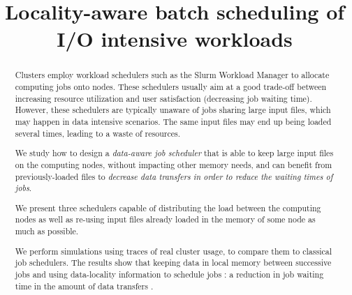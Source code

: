\documentclass[sigconf,review,anonymous]{acmart}
\newcommand{\rev}[1]{{\color{black}{#1}}}
\begin{document}
\title{Locality-aware batch scheduling of I/O intensive workloads}

\begin{abstract}
  Clusters employ workload schedulers such as
  the Slurm Workload Manager to allocate computing jobs onto
  nodes. These schedulers usually aim at a good trade-off between
  increasing resource utilization and user satisfaction (decreasing
  job waiting time). However, these schedulers are typically unaware
  of jobs sharing large input files, which may happen in data
  intensive scenarios. The same input files may end up being loaded several
  times, leading to a waste of resources.
   
  We study how to design a \textit{data-aware job scheduler} that is
  able to keep large input files on the computing nodes, without
  impacting other memory needs, and can benefit from previously-loaded files to
  \textit{decrease data transfers in order to reduce the waiting times of jobs}.

  We present three schedulers capable of distributing the load between
  the computing nodes as well as re-using input files already loaded
  in the memory of some node as much as possible.
  
  We perform simulations using traces of real cluster usage, to compare
  them to classical job schedulers. The results show that
  keeping data in local memory between successive jobs and using data-locality
  information to schedule jobs \rev{improves performance compared
  to a widely used scheduler (FCFS)}: a reduction in job waiting time
  \rev{(a 7.5\% improvement in stretch), and a decrease} in the
  amount of data transfers \rev{(7\%)}.



\end{abstract}
\end{document}
